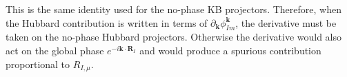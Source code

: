 \documentclass[11pt]{article}
\begin{document}
This is the same identity used for the no-phase KB projectors. Therefore,
when the Hubbard contribution is written in terms of
$\partial_{\mathbf k}\phi_{Im}^{\mathbf k}$, the derivative must be
taken on the no-phase Hubbard projectors. Otherwise the derivative would
also act on the global phase $e^{-i\mathbf k\cdot\mathbf R_I}$ and would
produce a spurious contribution proportional to $R_{I,\mu}$.
\end{document}
